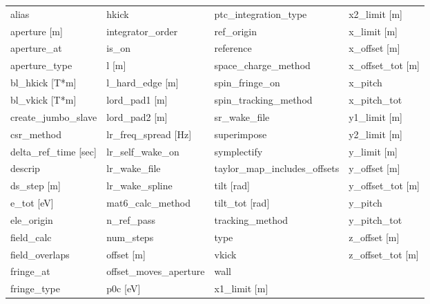  \begin{tabular}{llll} \toprule
alias                          & hkick                          & ptc_integration_type           & x2_limit [m]                   \\
aperture [m]                   & integrator_order               & ref_origin                     & x_limit [m]                    \\
aperture_at                    & is_on                          & reference                      & x_offset [m]                   \\
aperture_type                  & l [m]                          & space_charge_method            & x_offset_tot [m]               \\
bl_hkick [T*m]                 & l_hard_edge [m]                & spin_fringe_on                 & x_pitch                        \\
bl_vkick [T*m]                 & lord_pad1 [m]                  & spin_tracking_method           & x_pitch_tot                    \\
create_jumbo_slave             & lord_pad2 [m]                  & sr_wake_file                   & y1_limit [m]                   \\
csr_method                     & lr_freq_spread [Hz]            & superimpose                    & y2_limit [m]                   \\
delta_ref_time [sec]           & lr_self_wake_on                & symplectify                    & y_limit [m]                    \\
descrip                        & lr_wake_file                   & taylor_map_includes_offsets    & y_offset [m]                   \\
ds_step [m]                    & lr_wake_spline                 & tilt [rad]                     & y_offset_tot [m]               \\
e_tot [eV]                     & mat6_calc_method               & tilt_tot [rad]                 & y_pitch                        \\
ele_origin                     & n_ref_pass                     & tracking_method                & y_pitch_tot                    \\
field_calc                     & num_steps                      & type                           & z_offset [m]                   \\
field_overlaps                 & offset [m]                     & vkick                          & z_offset_tot [m]               \\
fringe_at                      & offset_moves_aperture          & wall                           &                                \\
fringe_type                    & p0c [eV]                       & x1_limit [m]                   &                                \\
 \bottomrule
 \end{tabular}
 \vfill
 
